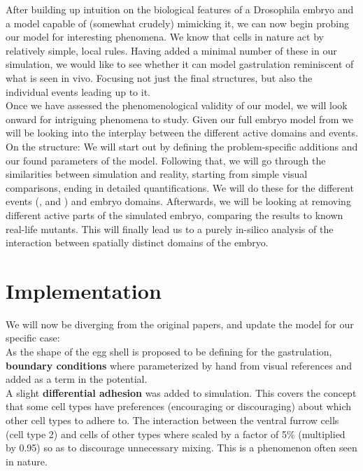 After building up intuition on the biological features of a Drosophila embryo and a model capable of (somewhat crudely) mimicking it, we can now begin probing our model for interesting phenomena. We know that cells in nature act by relatively simple, local rules. Having added a minimal number of these in our simulation, we would like to see whether it can model gastrulation reminiscent of what is seen in vivo. Focusing not just the final structures, but also the individual events leading up to it. \\

Once we have assessed the phenomenological validity of our model, we will look onward for intriguing phenomena to study. Given our full embryo model from we will be looking into the interplay between the different active domains and events.\\


On the structure: We will start out by defining the problem-specific additions and our found parameters of the model. Following that, we will go through the similarities between simulation and reality, starting from simple visual comparisons, ending in detailed quantifications. We will do these for the different events (,  and ) and embryo domains. Afterwards, we will be looking at removing different active parts of the simulated embryo, comparing the results to known real-life mutants. This will finally lead us to a purely in-silico analysis of the interaction between spatially distinct domains of the embryo.\\ 

\renewcommand{\contentsname}{Results Section Table of Contents}
 \setcounter{tocdepth}{3}
\localtableofcontents
\renewcommand{\contentsname}{Table of Contents}
 \setcounter{tocdepth}{1} 


\newpage
\section{Implementation}

We will now be diverging from the original papers, and update the model for our specific case:\\

As the shape of the egg shell is proposed to be defining for the gastrulation, \textbf{boundary conditions} where parameterized by hand from visual references and added as a term in the potential.\\

A slight \textbf{differential adhesion} was added to simulation. This covers the concept that some cell types have preferences (encouraging or discouraging) about which other cell types to adhere to.
The interaction between the ventral furrow cells (cell type 2) and cells of other types where scaled by a factor of 5\% (multiplied by 0.95) so as to discourage unnecessary mixing. This is a phenomenon often seen in nature.\\

